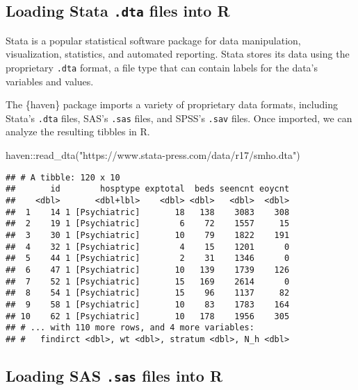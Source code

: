 \documentclass[
]{krantz}
\makeatletter
\newenvironment{Shaded}{\begin{snugshade}}{\end{snugshade}}
\newcommand{\FunctionTok}[1]{\textcolor[rgb]{0,0,0}{#1}}
\newcommand{\NormalTok}[1]{#1}
\newcommand{\SpecialCharTok}[1]{\textcolor[rgb]{0,0,0}{#1}}
\newcommand{\StringTok}[1]{\textcolor[rgb]{0.5,0.5,0.5}{#1}}
\newenvironment{kframe}{%
\medskip{}
\setlength{\fboxsep}{.8em}
 \def\at@end@of@kframe{}%
 \ifinner\ifhmode%
  \def\at@end@of@kframe{\end{minipage}}%
  \begin{minipage}{\columnwidth}%
 \fi\fi%
 \def\FrameCommand##1{\hskip\@totalleftmargin \hskip-\fboxsep
 \colorbox{shadecolor}{##1}\hskip-\fboxsep
     \hskip-\linewidth \hskip-\@totalleftmargin \hskip\columnwidth}%
 \MakeFramed {\advance\hsize-\width
   \@totalleftmargin\z@ \linewidth\hsize
   \@setminipage}}%
 {\par\unskip\endMakeFramed%
 \at@end@of@kframe}
\renewenvironment{Shaded}{\begin{kframe}}{\end{kframe}}
\makeatother
\begin{document}
\hypertarget{loading-stata-.dta-files-into-r}{%
\subsection{\texorpdfstring{Loading Stata \texttt{.dta} files into R}{Loading Stata .dta files into R}}\label{loading-stata-.dta-files-into-r}}

Stata is a popular statistical software package for data manipulation, visualization, statistics, and automated reporting. Stata stores its data using the proprietary \texttt{.dta} format, a file type that can contain labels for the data's variables and values.

The \{haven\} package imports a variety of proprietary data formats, including Stata's \texttt{.dta} files, SAS's \texttt{.sas} files, and SPSS's \texttt{.sav} files. Once imported, we can analyze the resulting tibbles in R.

\begin{Shaded}
\begin{Highlighting}[]
\NormalTok{haven}\SpecialCharTok{::}\FunctionTok{read\_dta}\NormalTok{(}\StringTok{"https://www.stata{-}press.com/data/r17/smho.dta"}\NormalTok{)}
\end{Highlighting}
\end{Shaded}

\begin{verbatim}
## # A tibble: 120 x 10
##       id        hosptype exptotal  beds seencnt eoycnt
##    <dbl>       <dbl+lbl>    <dbl> <dbl>   <dbl>  <dbl>
##  1    14 1 [Psychiatric]       18   138    3083    308
##  2    19 1 [Psychiatric]        6    72    1557     15
##  3    30 1 [Psychiatric]       10    79    1822    191
##  4    32 1 [Psychiatric]        4    15    1201      0
##  5    44 1 [Psychiatric]        2    31    1346      0
##  6    47 1 [Psychiatric]       10   139    1739    126
##  7    52 1 [Psychiatric]       15   169    2614      0
##  8    54 1 [Psychiatric]       15    96    1137     82
##  9    58 1 [Psychiatric]       10    83    1783    164
## 10    62 1 [Psychiatric]       10   178    1956    305
## # ... with 110 more rows, and 4 more variables:
## #   findirct <dbl>, wt <dbl>, stratum <dbl>, N_h <dbl>
\end{verbatim}

\hypertarget{loading-sas-.sas-files-into-r}{%
\subsection{\texorpdfstring{Loading SAS \texttt{.sas} files into R}{Loading SAS .sas files into R}}\label{loading-sas-.sas-files-into-r}}
\end{document}
